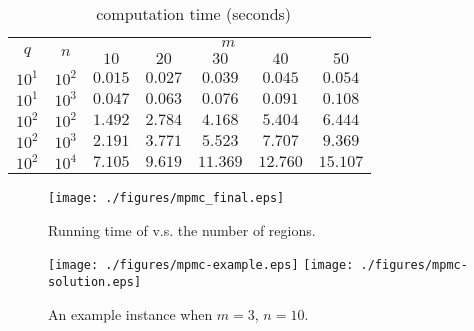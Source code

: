 \begin{table}[ht!]
    \vspace*{-2mm}
    \footnotesize
    \centering
    \begin{tabular}{|c|c|c|c|c|c|c|} 
        \hline
        \multirow{2}{*}{$q$} & \multirow{2}{*}{$n$} & \multicolumn{5}{|c|}{$m$} \\ \cline{3-7}
        \rule{0pt}{2.5ex} & & $10$ & $20$ & $30$ & $40$ & $50$ \\ \hline
        \rule{0pt}{2.5ex} $10^1$ & $10^2$ & $ 0.015$ & $ 0.027$ & $ 0.039$ & $ 0.045$ & $ 0.054$ \\ \hline
        \rule{0pt}{2.5ex} $10^1$ & $10^3$ & $ 0.047$ & $ 0.063$ & $ 0.076$ & $ 0.091$ & $ 0.108$ \\ \hline
        \rule{0pt}{2.5ex} $10^2$ & $10^2$ & $ 1.492$ & $ 2.784$ & $ 4.168$ & $ 5.404$ & $ 6.444$ \\ \hline
        \rule{0pt}{2.5ex} $10^2$ & $10^3$ & $ 2.191$ & $ 3.771$ & $ 5.523$ & $ 7.707$ & $ 9.369$ \\ \hline
        \rule{0pt}{2.5ex} $10^2$ & $10^4$ & $ 7.105$ & $ 9.619$ & $11.369$ & $12.760$ & $15.107$ \\ \hline
    \end{tabular}
    \vspace*{-2mm}
    \caption{\label{eval:opg-mpmc:2} \algoMRG~computation time (seconds)}
    \vspace*{-4mm}
\end{table}

\begin{figure}[ht!]
    \centering
    \texttt{[image: ./figures/mpmc\_final.eps]}
    \vspace*{-2mm}
    \caption{\label{fig:opg-mpmc:m}Running time of \algoMRG 
		v.s. the number of regions.}
    \vspace*{-2mm}
\end{figure}

\begin{figure}[ht!]
    \centering
    \texttt{[image: ./figures/mpmc-example.eps]}
    \texttt{[image: ./figures/mpmc-solution.eps]}
    \vspace*{-3mm}
    \caption{\label{fig:opg-mpmc-ex} An example instance when $m = 3$, $n = 10$.} 
    \vspace*{-4mm}
\end{figure}

